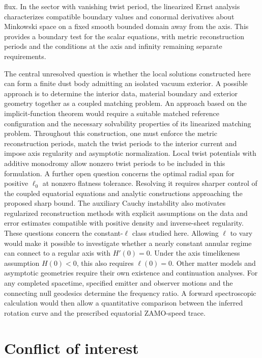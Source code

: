 \documentclass[amsmath,amsfonts,amssymb,aps,pra,superscriptaddress,10pt]{revtex4-2}
\numberwithin{equation}{section}
\theoremstyle{plain}
\theoremstyle{definition}
\theoremstyle{remark}
\theoremstyle{definition}
\newcommand{\ellzero}{\ell_0}
\begin{document}
flux. In the sector with vanishing twist period, the linearized Ernst analysis characterizes compatible boundary values and conormal derivatives about Minkowski space on a fixed smooth bounded domain away from the axis. This provides a boundary test for the scalar equations, with metric reconstruction periods and the conditions at the axis and infinity remaining separate requirements.

The central unresolved question is whether the local solutions constructed here can form a finite dust body admitting an isolated vacuum exterior. A possible approach is to determine the interior data, material boundary and exterior geometry together as a coupled matching problem. An approach based on the implicit-function theorem would require a suitable matched reference configuration and the necessary solvability properties of its linearized matching problem. Throughout this construction, one must enforce the metric reconstruction periods, match the twist periods to the interior current and impose axis regularity and asymptotic normalization. Local twist potentials with additive monodromy allow nonzero twist periods to be included in this formulation. A further open question concerns the optimal radial span for positive $\ellzero$ at nonzero flatness tolerance. Resolving it requires sharper control of the coupled equatorial equations and analytic constructions approaching the proposed sharp bound. The auxiliary Cauchy instability also motivates regularized reconstruction methods with explicit assumptions on the data and error estimates compatible with positive density and inverse-sheet regularity. These questions concern the constant-$\ell$ class studied here. Allowing $\ell$ to vary would make it possible to investigate whether a nearly constant annular regime can connect to a regular axis with $H'(0)=0$. Under the axis timelikeness assumption $H(0)<0$, this also requires $\ell(0)=0$. Other matter models and asymptotic geometries require their own existence and continuation analyses. For any completed spacetime, specified emitter and observer motions and the connecting null geodesics determine the frequency ratio. A forward spectroscopic calculation would then allow a quantitative comparison between the inferred rotation curve and the prescribed equatorial ZAMO-speed trace.

\section*{Conflict of interest}
\end{document}
